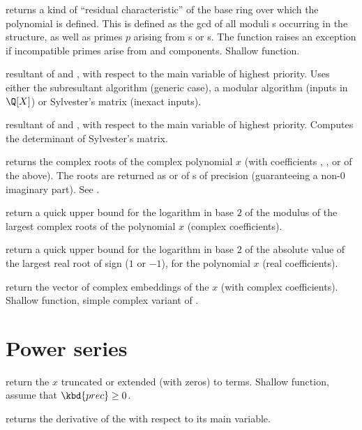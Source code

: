  returns a kind of ``residual
characteristic'' of the base ring over which the polynomial is defined. This
is defined as the gcd of all moduli s occurring in the structure,
as well as primes $p$ arising from s or s. The function
raises an exception if incompatible primes arise from  and
 components. Shallow function.

 resultant of  and , with
respect to the main variable of highest priority. Uses either the
subresultant algorithm (generic case), a modular algorithm (inputs in
$\Q[X]$) or Sylvester's matrix (inexact inputs).

 resultant of  and , with
respect to the main variable of highest priority. Computes the determinant
of Sylvester's matrix.

 returns the complex roots of
the complex polynomial $x$ (with coefficients , ,
 or  of the above). The roots are returned
as  or  of s of precision 
(guaranteeing a non-$0$ imaginary part). See .

 return a quick upper bound for the
logarithm in base $2$ of the modulus of the largest complex roots of
the polynomial $x$ (complex coefficients).

 return a quick upper
bound for the logarithm in base $2$ of the absolute value of the largest
real root of sign  ($1$ or $-1$), for the polynomial $x$ (real
coefficients).

 return the vector of complex
embeddings of the  $x$ (with complex coefficients). Shallow
function, simple complex variant of .

\section{Power series}

 return the  $x$ truncated
or extended (with zeros) to  terms. Shallow function, assume
that $\kbd{prec} \geq 0$.

 returns the derivative of the  
with respect to its main variable.

